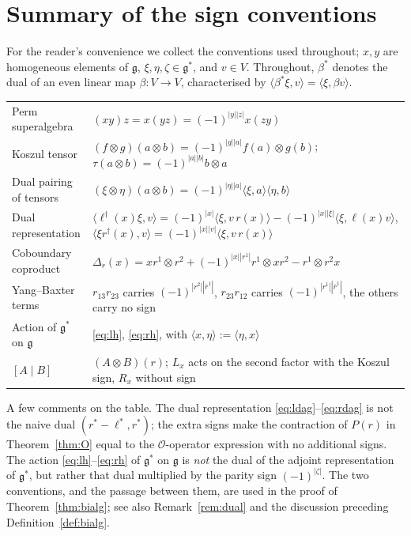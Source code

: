 \documentclass[11pt]{article}
\theoremstyle{definition}
\newcommand{\g}{\mathfrak{g}}
\newcommand{\lr}[1]{\langle #1\rangle}
\begin{document}
\section{Summary of the sign conventions}\label{app:signs}

For the reader's convenience we collect the conventions used throughout; $x,y$ are homogeneous elements of $\g$, $\xi,\eta,\zeta\in\g^*$, and $v\in V$. Throughout, $\beta^*$ denotes the dual of an even linear map $\beta:V\to V$, characterised by $\lr{\beta^*\xi,v}=\lr{\xi,\beta v}$.

\medskip
\begin{center}
\renewcommand{\arraystretch}{1.5}
\begin{tabular}{p{3.8cm}p{10.2cm}}
\hline
Perm superalgebra & $(xy)z=x(yz)=(-1)^{|y||z|}x(zy)$\\
Koszul tensor & $(f\otimes g)(a\otimes b)=(-1)^{|g||a|}f(a)\otimes g(b)$; $\tau(a\otimes b)=(-1)^{|a||b|}b\otimes a$\\
Dual pairing of tensors & $(\xi\otimes\eta)(a\otimes b)=(-1)^{|\eta||a|}\lr{\xi,a}\lr{\eta,b}$\\
Dual representation & $\lr{\ell^\dagger(x)\xi,v}=(-1)^{|x|}\lr{\xi,v\,r(x)}-(-1)^{|x||\xi|}\lr{\xi,\ell(x)v}$, \quad $\lr{\xi r^\dagger(x),v}=(-1)^{|x||v|}\lr{\xi,v\,r(x)}$\\
Coboundary coproduct & $\Delta_r(x)=xr^1\otimes r^2+(-1)^{|x||r^1|}r^1\otimes xr^2-r^1\otimes r^2x$\\
Yang--Baxter terms & $r_{13}r_{23}$ carries $(-1)^{|r^2||\bar r^1|}$, $r_{23}r_{12}$ carries $(-1)^{|r^1||\bar r^1|}$, the others carry no sign\\
Action of $\g^*$ on $\g$ & \eqref{eq:lh}, \eqref{eq:rh}, with $\lr{x,\eta}:=\lr{\eta,x}$\\
$[A\mid B]$ & $(A\otimes B)(r)$; $L_x$ acts on the second factor with the Koszul sign, $R_x$ without sign\\
\hline
\end{tabular}
\end{center}

\medskip
A few comments on the table. The dual representation \eqref{eq:ldag}--\eqref{eq:rdag} is not the naive dual $(r^*-\ell^*,r^*)$; the extra signs make the contraction of $P(r)$ in Theorem~\ref{thm:O} equal to the $\mathcal O$-operator expression with no additional signs. The action \eqref{eq:lh}--\eqref{eq:rh} of $\g^*$ on $\g$ is \emph{not} the dual of the adjoint representation of $\g^*$, but rather that dual multiplied by the parity sign $(-1)^{|\zeta|}$. The two conventions, and the passage between them, are used in the proof of Theorem~\ref{thm:bialg}; see also Remark~\ref{rem:dual} and the discussion preceding Definition~\ref{def:bialg}.
\end{document}
